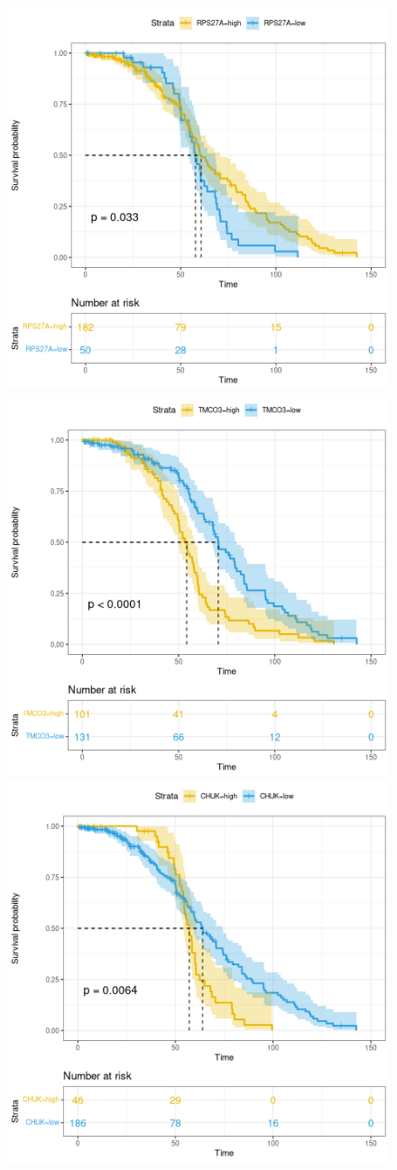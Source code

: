 \documentclass[fleqn,10pt]{SelfArx} %
\begin{document}
		 \begin{figure}[ht]\centering
			 \begin{multicols}{2}

	 			\includegraphics[width=0.7\linewidth]{figures/RPS27A.png}
			 	\includegraphics[width=0.7\linewidth]{figures/TMCO3.png}
	 			\includegraphics[width=0.7\linewidth]{figures/CHUK.png}

\end{multicols}
\end{figure}
\end{document}
